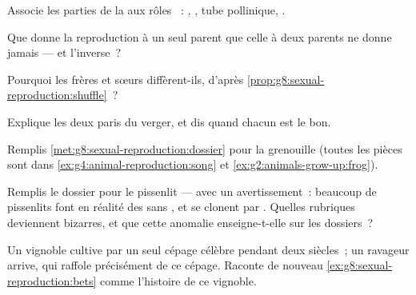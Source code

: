 \begin{exercise}[$\star$]\label{exo:g8:sexual-reproduction:4}
Associe les parties de la  aux rôles ~: ,
, tube pollinique, .
\end{exercise}

\begin{exercise}[$\star$]\label{exo:g8:sexual-reproduction:5}
Que donne la reproduction à un seul parent que celle à deux parents
ne donne jamais --- et l'inverse~?
\end{exercise}

\begin{exercise}[$\star$]\label{exo:g8:sexual-reproduction:6}
Pourquoi les frères et sœurs diffèrent-ils, d'après
\cref{prop:g8:sexual-reproduction:shuffle}~?
\end{exercise}

\begin{exercise}[$\star\star$]\label{exo:g8:sexual-reproduction:7}
Explique les deux paris du verger, et dis quand chacun est le bon.
\end{exercise}

\begin{exercise}[$\star\star$]\label{exo:g8:sexual-reproduction:8}
Remplis \cref{met:g8:sexual-reproduction:dossier} pour la grenouille
(toutes les pièces sont dans
\cref{ex:g4:animal-reproduction:song} et
\cref{ex:g2:animals-grow-up:frog}).
\end{exercise}

\begin{exercise}[$\star\star$]\label{exo:g8:sexual-reproduction:9}
Remplis le dossier pour le pissenlit --- avec un avertissement~:
beaucoup de pissenlits font en réalité des  sans ,
et se clonent par . Quelles rubriques deviennent bizarres, et
que cette anomalie enseigne-t-elle sur les dossiers~?
\end{exercise}

\begin{exercise}[$\star\star$]\label{exo:g8:sexual-reproduction:10}
Un vignoble cultive par  un seul cépage célèbre pendant deux
siècles~; un ravageur arrive, qui raffole précisément de ce cépage.
Raconte de nouveau \cref{ex:g8:sexual-reproduction:bets} comme
l'histoire de ce vignoble.
\end{exercise}


